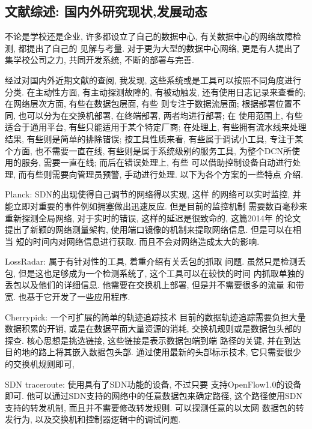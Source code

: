 {\begin{mdframed}[everyline=true]


\section{文献综述: 国内外研究现状,发展动态}

不论是学校还是企业, 许多都设立了自己的数据中心,
有关数据中心的网络故障检测, 都提出了自己的 见解与考量. 对于更为大型的数据中心网络,
更是有人提出了集学校公司之力, 共同开发系统, 不断的部署与完善.

经过对国内外近期文献的查阅, 我发现,
这些系统或是工具可以按照不同角度进行分类. 在主动性方面,
有主动探测故障的, 有被动触发, 还有使用日志记录来查看的; 在网络层次方面,
有些在数据包层面, 有些 则专注于数据流层面; 根据部署位置不同,
也可以分为在交换机部署, 在终端部署, 两者均进行部署; 在 使用范围上,
有些适合于通用平台, 有些只能适用于某个特定厂商; 在处理上,
有些拥有流水线来处理结果, 有些则是简单的排除错误; 按工具性质来看,
有些属于调试小工具, 专注于某个方面, 也不需要一直在线,
有些则是属于系统级别的服务工具, 为整个DCN所使用的服务, 需要一直在线;
而后在错误处理上, 有些 可以借助控制设备自动进行处理,
而有些则需要向管理员预警, 手动进行处理. 以下为各个方案的一些特点 介绍.

Planck:  SDN的出现使得自己调节的网络得以实现, 这样
的网络可以实时监控, 并能立即对重要的事件例如拥塞做出迅速反应.
但是目前的监控机制 需要数百毫秒来重新探测全局网络, 对于实时的错误,
这样的延迟是很致命的, 这篇2014年 的论文提出了新颖的网络测量架构,
使用端口镜像的机制来提取网络信息. 但是可以在相当
短的时间内对网络信息进行获取. 而且不会对网络造成太大的影响.

LossRadar:  属于有针对性的工具,
着重介绍有关丢包的抓取 问题. 虽然只是检测丢包,
但是这也足够成为一个检测系统了, 这个工具可以在较快的时间
内抓取单独的丢包以及他们的详细信息. 他需要在交换机上部署,
但是并不需要很多的流量 和带宽. 也基于它开发了一些应用程序.

Cherrypick:  一个可扩展的简单的轨迹追踪技术
目前的数据轨迹追踪需要负担大量数据积累的开销,
或是在数据平面大量资源的消耗, 交换机规则或是数据包头部的探查.
核心思想是挑选链接, 这些链接是表示数据包端到端 路径的关键,
并在到达目的地的路上将其嵌入数据包头部. 通过使用最新的头部标示技术,
它只需要很少的交换机规则即可,

SDN traceroute:  使用具有了SDN功能的设备, 不过只要
支持OpenFlow1.0的设备即可.
他可以通过SDN支持的网络中的任意数据包来确定路径,
这个路径使用SDN支持的转发机制, 而且并不需要修改转发规则.
可以探测任意的以太网 数据包的转发行为,
以及交换机和控制器逻辑中的调试问题.


\end{mdframed}}
